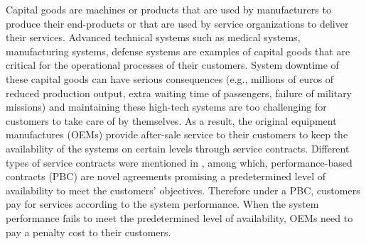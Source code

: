 \documentclass[preprint,12pt]{elsarticle}
\begin{document}
Capital goods are machines or products that are used by manufacturers to produce their end-products or that are used by service organizations to deliver their services. Advanced technical systems such as medical systems, manufacturing systems, defense systems are examples of capital goods that are critical for the operational processes of their customers. System downtime of these capital goods can have serious consequences (e.g., millions of euros of reduced production output, extra waiting time of passengers, failure of military missions) and maintaining these high-tech systems are too challenging for customers to take care of by themselves. As a result, the original equipment manufactures (OEMs) provide after-sale service to their customers to keep the availability of the systems on certain levels through service contracts. Different types of service contracts were mentioned in \citet{Cohen2006}, among which, performance-based contracts (PBC) are novel agreements promising a predetermined level of availability to meet the customers' objectives. Therefore under a PBC, customers pay for services according to the system performance. When the system performance fails to meet the predetermined level of availability, OEMs need to pay a penalty cost to their customers.


\end{document}
